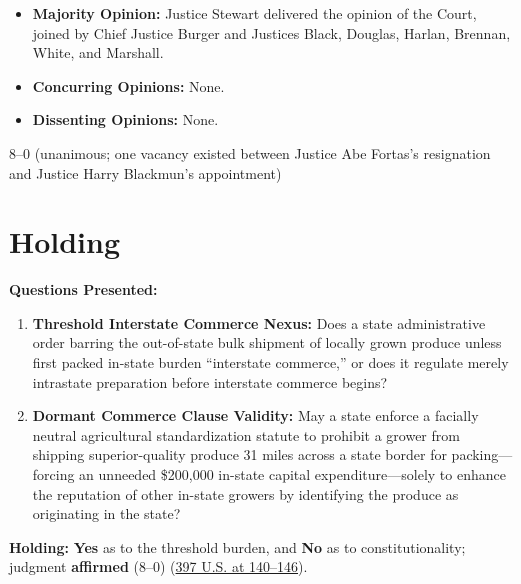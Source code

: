 \documentclass[12pt]{article}
\begin{document}
\begin{itemize}
    \item \textbf{Majority Opinion:} Justice Stewart delivered the opinion of the Court, joined by Chief Justice Burger and Justices Black, Douglas, Harlan, Brennan, White, and Marshall.
    \item \textbf{Concurring Opinions:} None.
    \item \textbf{Dissenting Opinions:} None.
\end{itemize}

8--0 (unanimous; one vacancy existed between Justice Abe Fortas's resignation and Justice Harry Blackmun's appointment)

\section{Holding}
\textbf{Questions Presented:}

\begin{enumerate}
  \item \textbf{Threshold Interstate Commerce Nexus:} Does a state administrative order barring the out-of-state bulk shipment of locally grown produce unless first packed in-state burden ``interstate commerce,'' or does it regulate merely intrastate preparation before interstate commerce begins?
  \item \textbf{Dormant Commerce Clause Validity:} May a state enforce a facially neutral agricultural standardization statute to prohibit a grower from shipping superior-quality produce 31 miles across a state border for packing---forcing an unneeded \$200,000 in-state capital expenditure---solely to enhance the reputation of other in-state growers by identifying the produce as originating in the state?
\end{enumerate}

\textbf{Holding:} \textbf{Yes} as to the threshold burden, and \textbf{No} as to constitutionality; judgment \textbf{affirmed} (8--0) (\href{https://supreme.justia.com/cases/federal/us/397/137/}{397 U.S. at 140--146}).
\end{document}

